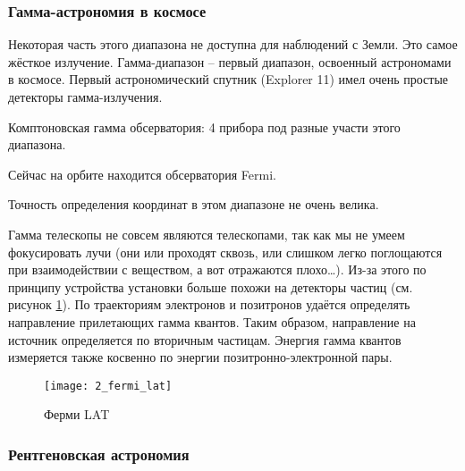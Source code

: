 \subsubsection{Гамма-астрономия в космосе}

Некоторая часть этого диапазона не доступна для наблюдений с Земли. Это самое жёсткое излучение. Гамма-диапазон – первый диапазон, освоенный астрономами в космосе. Первый астрономический спутник (Explorer 11) имел очень простые детекторы гамма-излучения.

Комптоновская гамма обсерватория: 4 прибора под разные участи этого диапазона. 

Сейчас на орбите находится обсерватория Fermi. 

Точность определения координат в этом диапазоне не очень велика.

Гамма телескопы  не совсем являются телескопами, так как мы не умеем фокусировать лучи (они или проходят сквозь, или слишком легко поглощаются при взаимодействии с веществом, а вот отражаются плохо…). Из-за этого по принципу устройства установки больше похожи на детекторы частиц (см. рисунок \ref{fig:2_fermi_lat}). По траекториям электронов и позитронов удаётся определять направление прилетающих  гамма квантов. Таким образом, направление на источник определяется по вторичным частицам. Энергия гамма квантов измеряется также косвенно по энергии позитронно-электронной пары.

\begin{figure}[H]
	\centering
	\texttt{[image: 2\_fermi\_lat]}
	\caption{Ферми LAT}
	\label{fig:2_fermi_lat}
\end{figure}

\subsubsection{Рентгеновская астрономия}

